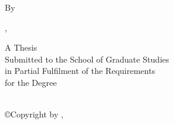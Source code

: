 \documentclass[ 12pt,
		twoside,%
		letterpaper, 
		openright
	      ]{book}
\begin{document}
%
%
%
%

\frontmatter

\thispagestyle{empty}
\begin{flushleft}
	\vspace*{\fill}
	\begin{center}
	{\bfseries \MakeUppercase \ThesisTitle}
	\end{center}
	\vspace*{\fill}
	\vspace*{\fill}
\end{flushleft}

\newpage  

\setcounter{page}{1}
\begin{titlepage}
	\vspace*{\fill}
	\begin{center}
	{\large\bfseries \MakeUppercase \ThesisTitle}

	\vspace{1cm}

	{By}\\ 

	\vspace{1cm}

	{{\bfseries \MakeUppercase\ThesisAuthor}, \AuthorsPreviousDegreesFirstPage}\\

 	\vspace{4cm}

	{A Thesis}\\
	{Submitted to the School of Graduate Studies}\\
	{in Partial Fulfilment of the Requirements}\\
	{for the Degree}\\ 
	{\ThesisDegreeLong}

 	\vspace{4cm}
	\vspace*{\fill}

	{\ThesisInstitution}\\ 
	{\copyright Copyright by \ThesisAuthor, \ThesisYear}
	\end{center}
	\vspace*{\fill}
\end{titlepage}


\pagestyle{plain} %
\cfoot{\thepage} \lhead{}\chead{}%
\end{document}
